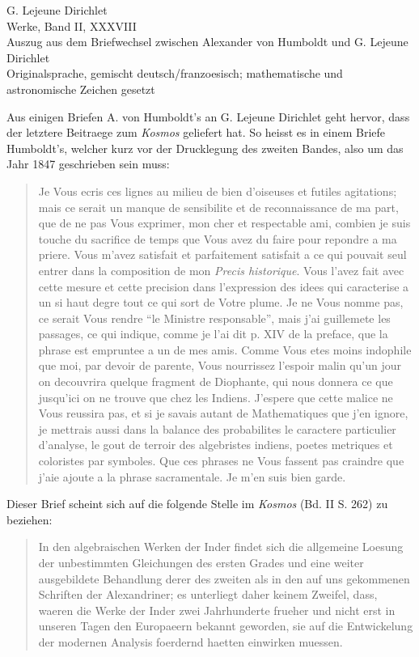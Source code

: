 \documentclass[11pt]{article}
\newcommand{\paperhead}[3]{\begin{center}{\Large G. Lejeune Dirichlet}\\[0.25em]{\large Werke, Band II, #1}\\[0.75em]{\LARGE #2}\\[0.35em]{\large #3}\end{center}\bigskip}
\begin{document}
\paperhead{XXXVIII}{Auszug aus dem Briefwechsel zwischen Alexander von Humboldt und G. Lejeune Dirichlet}{Originalsprache, gemischt deutsch/franzoesisch; mathematische und astronomische Zeichen gesetzt}

Aus einigen Briefen A. von Humboldt's an G. Lejeune Dirichlet geht hervor, dass der letztere Beitraege zum \emph{Kosmos} geliefert hat. So heisst es in einem Briefe Humboldt's, welcher kurz vor der Drucklegung des zweiten Bandes, also um das Jahr 1847 geschrieben sein muss:

\begin{quote}\small
Je Vous ecris ces lignes au milieu de bien d'oiseuses et futiles agitations; mais ce serait un manque de sensibilite et de reconnaissance de ma part, que de ne pas Vous exprimer, mon cher et respectable ami, combien je suis touche du sacrifice de temps que Vous avez du faire pour repondre a ma priere. Vous m'avez satisfait et parfaitement satisfait a ce qui pouvait seul entrer dans la composition de mon \emph{Precis historique}. Vous l'avez fait avec cette mesure et cette precision dans l'expression des idees qui caracterise a un si haut degre tout ce qui sort de Votre plume. Je ne Vous nomme pas, ce serait Vous rendre ``le Ministre responsable'', mais j'ai guillemete les passages, ce qui indique, comme je l'ai dit p. XIV de la preface, que la phrase est empruntee a un de mes amis. Comme Vous etes moins indophile que moi, par devoir de parente, Vous nourrissez l'espoir malin qu'un jour on decouvrira quelque fragment de Diophante, qui nous donnera ce que jusqu'ici on ne trouve que chez les Indiens. J'espere que cette malice ne Vous reussira pas, et si je savais autant de Mathematiques que j'en ignore, je mettrais aussi dans la balance des probabilites le caractere particulier d'analyse, le gout de terroir des algebristes indiens, poetes metriques et coloristes par symboles. Que ces phrases ne Vous fassent pas craindre que j'aie ajoute a la phrase sacramentale. Je m'en suis bien garde.
\end{quote}

Dieser Brief scheint sich auf die folgende Stelle im \emph{Kosmos} (Bd. II S. 262) zu beziehen:

\begin{quote}\small
In den algebraischen Werken der Inder findet sich die allgemeine Loesung der unbestimmten Gleichungen des ersten Grades und eine weiter ausgebildete Behandlung derer des zweiten als in den auf uns gekommenen Schriften der Alexandriner; es unterliegt daher keinem Zweifel, dass, waeren die Werke der Inder zwei Jahrhunderte frueher und nicht erst in unseren Tagen den Europaeern bekannt geworden, sie auf die Entwickelung der modernen Analysis foerdernd haetten einwirken muessen.
\end{quote}
\end{document}
